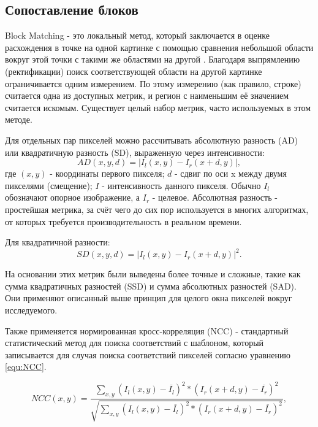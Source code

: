 \subsection{Сопоставление блоков}
\label{BM}
Block Matching - это локальный метод, который заключается в оценке расхождения в точке на одной картинке с помощью сравнения небольшой области вокруг этой точки с такими же областями 
на другой \cite{}. Благодаря выпрямлению (ректификации) поиск соответствующей области на другой картинке ограничивается одним измерением. По этому измерению (как правило, строке) 
считается одна из доступных метрик, и регион с наименьшим её значением считается искомым. Существует целый набор метрик, часто используемых в этом методе. 

Для отдельных пар пикселей можно рассчитывать абсолютную разность (AD) или квадратичную разность (SD), выраженную через интенсивности:
\begin{equation}
	AD(x, y, d) = |I_l(x,y) - I_r(x+d, y)|,			
	\label{eq:AD}
\end{equation}
где $(x, y)$ - координаты первого пикселя; $d$ - сдвиг по оси x между двумя пикселями (смещение); $I$ - интенсивность данного пикселя. Обычно $I_l$ обозначают опорное изображение, а $I_r$ - 
целевое. Абсолютная разность - простейшая метрика, за счёт чего до сих пор используется в многих алгоритмах, от которых требуется производительность в реальном времени. 

Для квадратичной разности: 
\begin{equation}
	SD(x, y, d) = |I_l(x,y) - I_r(x+d, y)|^2.		
	\label{eq:SD}
\end{equation}

На основании этих метрик были выведены более точные и сложные, такие как сумма квадратичных разностей (SSD) и сумма абсолютных разностей (SAD). Они применяют описанный выше принцип для целого 
окна пикселей вокруг исследуемого.

Также применяется нормированная кросс-корреляция (NCC) - стандартный статистический метод для поиска соответствий с шаблоном, который записывается для случая поиска соответствий пикселей 
согласно уравнению \ref{equ:NCC}.

\begin{equation}
	NCC(x, y) = \frac{ \sum_{x, y}^{} (I_l(x, y) - \overline{I_l} )^2 * ( I_r(x + d, y) - \overline{I_r} )^2   }{ \sqrt{ \sum_{x, y}^{} (I_l(x, y) - \overline{I_l} )^2 * ( I_r(x + d, y) - \overline{I_r} )^2 }  }, 
	\label{equ:NCC}
\end{equation}

